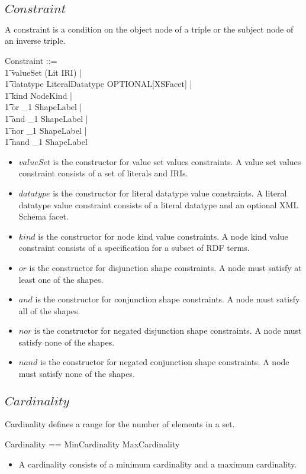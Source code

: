 \documentclass{article}
\begin{document}
\subsection{$Constraint$}
A constraint is a condition on the object node of a triple or the subject node of an inverse triple.
\begin{zed}
	Constraint ::= \\
\t1		valueSet \ldata \power (Lit \cup IRI) \rdata | \\
\t1		datatype \ldata LiteralDatatype \cross OPTIONAL[XSFacet] \rdata | \\
\t1		kind \ldata NodeKind \rdata | \\
\t1		or \ldata \seq_1 ShapeLabel \rdata | \\
\t1		and \ldata \seq_1 ShapeLabel \rdata | \\
\t1		nor \ldata \seq_1 ShapeLabel \rdata | \\
\t1		nand \ldata \seq_1 ShapeLabel \rdata
\end{zed}
\begin{itemize}
\item $valueSet$ is the constructor for value set values constraints.
A value set values constraint consists of a set of literals and IRIs.
\item $datatype$ is the constructor for literal datatype value constraints.
A literal datatype value constraint consists of a literal datatype and an optional XML Schema facet.
\item $kind$ is the constructor for node kind value constraints.
A node kind value constraint consists of a specification for a subset of RDF terms.
\item $or$ is the constructor for disjunction shape constraints.
A node must satisfy at least one of the shapes.
\item $and$ is the constructor for conjunction shape constraints.
A node must satisfy all of the shapes.
\item $nor$ is the constructor for negated disjunction shape constraints.
A node must satisfy none of the shapes.
\item $nand$ is the constructor for negated conjunction shape constraints.
A node must satisfy none of the shapes.
\end{itemize}

\subsection{$Cardinality$}
Cardinality defines a range for the number of elements in a set.
\begin{zed}
	Cardinality == MinCardinality \cross MaxCardinality
\end{zed}
\begin{itemize}
\item A cardinality consists of a minimum cardinality and a maximum cardinality.
\end{itemize}
\end{document}
